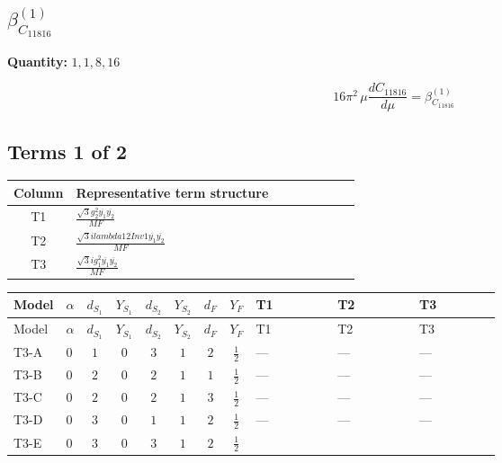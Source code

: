 \documentclass[8pt]{article}
\begin{document}
\begin{landscape}
\section*{$\beta_{C_{11816}}^{(1)}$}
\noindent\textbf{Quantity: }$\mathrm{1,1,8,16}$\par\smallskip
\[16\pi^2\,\mu\frac{d C_{11816}}{d\mu}=\beta_{C_{11816}}^{(1)}\]
\subsection*{Terms 1 of 2}
\begin{center}
\begin{tabular}{@{}c >{\raggedright\arraybackslash}p{0.82\linewidth}@{}}
\toprule
Column & Representative term structure \\
\midrule
T1 & \(\displaystyle \frac{\sqrt{3} g_{2}^{2} \overline{y_{1}} \overline{y_{2}}}{MF}\) \\
\midrule
T2 & \(\displaystyle \frac{\sqrt{3} i lambda12Inv1 \overline{y_{1}} \overline{y_{2}}}{MF}\) \\
\midrule
T3 & \(\displaystyle \frac{\sqrt{3} i g_{1}^{2} \overline{y_{1}} \overline{y_{2}}}{MF}\) \\
\midrule
\bottomrule
\end{tabular}
\end{center}
\smallskip
\tiny
\begin{longtable}{@{}llcccccc >{\raggedright\arraybackslash}p{0.21\linewidth} >{\raggedright\arraybackslash}p{0.21\linewidth} >{\raggedright\arraybackslash}p{0.21\linewidth}@{}}
\toprule
Model & $\alpha$ & $d_{S_1}$ & $Y_{S_1}$ & $d_{S_2}$ & $Y_{S_2}$ & $d_F$ & $Y_F$ & T1 & T2 & T3 \\
\midrule
\endfirsthead
\toprule
Model & $\alpha$ & $d_{S_1}$ & $Y_{S_1}$ & $d_{S_2}$ & $Y_{S_2}$ & $d_F$ & $Y_F$ & T1 & T2 & T3 \\
\midrule
\endhead
T3-A & $0$ & $1$ & $0$ & $3$ & $1$ & $2$ & $\frac{1}{2}$ & --- & --- & --- \\
\midrule
T3-B & $0$ & $2$ & $0$ & $2$ & $1$ & $1$ & $\frac{1}{2}$ & --- & --- & --- \\
\midrule
T3-C & $0$ & $2$ & $0$ & $2$ & $1$ & $3$ & $\frac{1}{2}$ & --- & --- & --- \\
\midrule
T3-D & $0$ & $3$ & $0$ & $1$ & $1$ & $2$ & $\frac{1}{2}$ & --- & --- & --- \\
\midrule
T3-E & $0$ & $3$ & $0$ & $3$ & $1$ & $2$ & $\frac{1}{2}$ & \scriptsize\adjustbox{max width=\linewidth}{$\begin{gathered} \frac{\sqrt{3} g_{2}^{2} \overline{y_{1}} \overline{y_{2}}}{6 MF}\end{gathered}$} & \scriptsize\adjustbox{max width=\linewidth}{$\begin{gathered} - \frac{\sqrt{3} i lambda12Inv1 \overline{y_{1}} \overline{y_{2}}}{6 MF}\end{gathered}$} & \scriptsize\adjustbox{max width=\linewidth}{$\begin{gathered} \frac{\sqrt{3} i g_{1}^{2} \overline{y_{1}} \overline{y_{2}}}{8 MF}\end{gathered}$} \\

\end{longtable}
\end{landscape}
\end{document}
